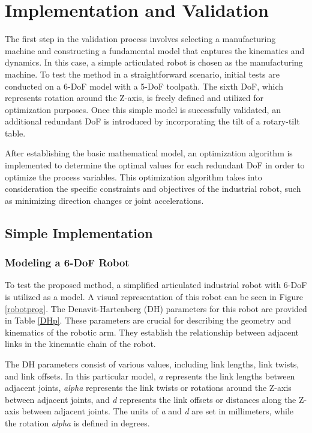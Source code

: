 \chapter{Implementation and Validation}%

The first step in the validation process involves selecting a manufacturing machine and constructing a fundamental model that captures the kinematics and dynamics. In this case, a simple articulated robot is chosen as the manufacturing machine. To test the method in a straightforward scenario, initial tests are conducted on a 6-\acrshort{DoF} model with a 5-\acrshort{DoF} toolpath. The sixth \acrshort{DoF}, which represents rotation around the Z-axis, is freely defined and utilized for optimization purposes. Once this simple model is successfully validated, an additional redundant \acrshort{DoF} is introduced by incorporating the tilt of a rotary-tilt table.

After establishing the basic mathematical model, an optimization algorithm is implemented to determine the optimal values for each redundant \acrshort{DoF} in order to optimize the process variables. This optimization algorithm takes into consideration the specific constraints and objectives of the industrial robot, such as minimizing direction changes or joint accelerations.



\section{Simple Implementation}%
\subsection{Modeling a 6-DoF Robot}
To test the proposed method, a simplified articulated industrial robot with 6-\acrshort{DoF} is utilized as a model. A visual representation of this robot can be seen in Figure \ref{robotprog}. The Denavit-Hartenberg (\acrshort{DH}) parameters for this robot are provided in Table \ref{DHp}. These parameters are crucial for describing the geometry and kinematics of the robotic arm. They establish the relationship between adjacent links in the kinematic chain of the robot.

The \acrshort{DH} parameters consist of various values, including link lengths, link twists, and link offsets. In this particular model, \textit{a} represents the link lengths between adjacent joints, \textit{alpha} represents the link twists or rotations around the Z-axis between adjacent joints, and \textit{d} represents the link offsets or distances along the Z-axis between adjacent joints. The units of \textit{a} and \textit{d} are set in millimeters, while the rotation \textit{alpha} is defined in degrees.

